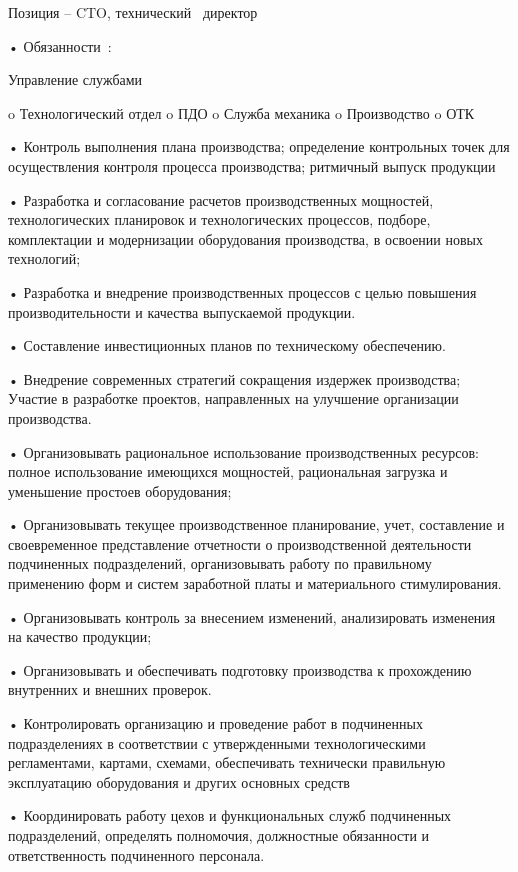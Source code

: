 \documentclass{../industrial-development}
\begin{document}
\lecturenotes

Позиция – CTO, технический~\cite{hh} директор~\cite{itcf}

•	Обязанности~\cite{rab}:

Управление службами

o	Технологический отдел
o	ПДО
o	Служба механика
o	Производство
o	ОТК

•	Контроль выполнения плана производства; определение контрольных точек для осуществления контроля процесса производства; ритмичный выпуск продукции

•	Разработка и согласование расчетов производственных мощностей, технологических планировок и технологических процессов, подборе, комплектации и модернизации оборудования производства, в освоении новых технологий;

•	Разработка и внедрение производственных процессов с целью повышения производительности и качества выпускаемой продукции.

•	Составление инвестиционных планов по техническому обеспечению.

•	Внедрение современных стратегий сокращения издержек производства; Участие в разработке проектов, направленных на улучшение организации производства.

•	Организовывать рациональное использование производственных ресурсов: полное использование имеющихся мощностей, рациональная загрузка и уменьшение простоев оборудования;

•	Организовывать текущее производственное планирование, учет, составление и своевременное представление отчетности о производственной деятельности подчиненных подразделений, организовывать работу по правильному применению форм и систем заработной платы и материального стимулирования.

•	Организовывать контроль за внесением изменений, анализировать изменения на качество продукции;

•	Организовывать и обеспечивать подготовку производства к прохождению внутренних и внешних проверок.

•	Контролировать организацию и проведение работ в подчиненных подразделениях в соответствии с утвержденными технологическими регламентами, картами, схемами, обеспечивать технически правильную эксплуатацию оборудования и других основных средств

•	Координировать работу цехов и функциональных служб подчиненных подразделений, определять полномочия, должностные обязанности и ответственность подчиненного персонала.
\end{document}
